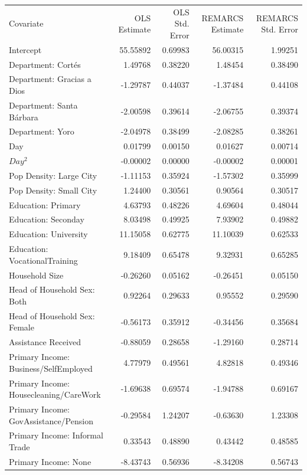 \begin{table}
    \small
    \centering
    \begin{tabular}{lrrrr}
        Covariate	&	OLS Estimate	&	OLS Std. Error	&	REMARCS Estimate	&	REMARCS Std. Error	\\
Intercept	&	55.55892	&	0.69983	&	56.00315	&	1.99251	\\
Department: Cort{\'e}s	&	1.49768	&	0.38220	&	1.48454	&	0.38490	\\
Department: Gracias a Dios	&	-1.29787	&	0.44037	&	-1.37484	&	0.44108	\\
Department: Santa B{\'a}rbara	&	-2.00598	&	0.39614	&	-2.06755	&	0.39374	\\
Department: Yoro	&	-2.04978	&	0.38499	&	-2.08285	&	0.38261	\\
Day	&	0.01799	&	0.00150	&	0.01627	&	0.00714	\\
$Day^2$	&	-0.00002	&	0.00000	&	-0.00002	&	0.00001	\\
Pop Density: Large City	&	-1.11153	&	0.35924	&	-1.57302	&	0.35999	\\
Pop Density: Small City	&	1.24400	&	0.30561	&	0.90564	&	0.30517	\\
Education: Primary	&	4.63793	&	0.48226	&	4.69604	&	0.48044	\\
Education: Seconday	&	8.03498	&	0.49925	&	7.93902	&	0.49882	\\
Education: University	&	11.15058	&	0.62775	&	11.10039	&	0.62533	\\
Education: VocationalTraining	&	9.18409	&	0.65478	&	9.32931	&	0.65285	\\
Household Size	&	-0.26260	&	0.05162	&	-0.26451	&	0.05150	\\
Head of Household Sex: Both	&	0.92264	&	0.29633	&	0.95552	&	0.29590	\\
Head of Household Sex: Female	&	-0.56173	&	0.35912	&	-0.34456	&	0.35684	\\
Assistance Received	&	-0.88059	&	0.28658	&	-1.29160	&	0.28714	\\
Primary Income: Business/SelfEmployed	&	4.77979	&	0.49561	&	4.82818	&	0.49346	\\
Primary Income: Housecleaning/CareWork	&	-1.69638	&	0.69574	&	-1.94788	&	0.69167	\\
Primary Income: GovAssistance/Pension	&	-0.29584	&	1.24207	&	-0.63630	&	1.23308	\\
Primary Income: Informal Trade	&	0.33543	&	0.48890	&	0.43442	&	0.48585	\\
Primary Income: None	&	-8.43743	&	0.56936	&	-8.34208	&	0.56743	\\

\end{tabular}
\end{table}
